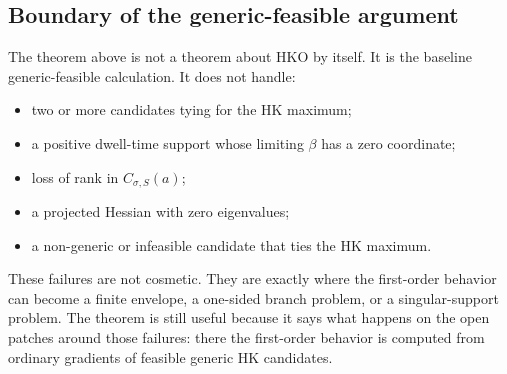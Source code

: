 \begin{unverified}
\subsection*{Boundary of the generic-feasible argument}

The theorem above is not a theorem about HKO by itself. It is the baseline
generic-feasible calculation. It does not handle:
\begin{itemize}
\item two or more candidates tying for the HK maximum;
\item a positive dwell-time support whose limiting \(\beta\) has a zero
  coordinate;
\item loss of rank in \(C_{\sigma,S}(a)\);
\item a projected Hessian with zero eigenvalues;
\item a non-generic or infeasible candidate that ties the HK maximum.
\end{itemize}
These failures are not cosmetic. They are exactly where the first-order
behavior can become a finite envelope, a one-sided branch problem, or a
singular-support problem. The theorem is still useful because it says
what happens on the open patches around those failures: there the first-order
behavior is computed from ordinary gradients of feasible generic HK candidates.
\end{unverified}
